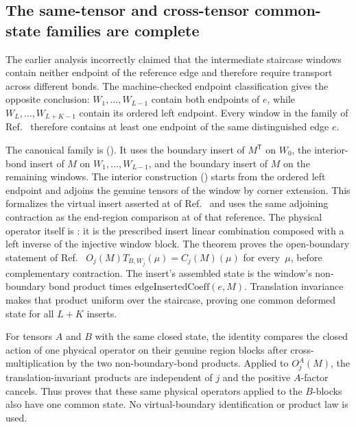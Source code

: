 \documentclass{article}
\begin{document}
\subsection{The same-tensor and cross-tensor common-state families are complete}

The earlier analysis incorrectly claimed that the intermediate staircase windows contain
neither endpoint of the reference edge and therefore require transport across different
bonds.  The machine-checked endpoint classification gives the opposite conclusion:
$W_1,\ldots,W_{L-1}$ contain both endpoints of $e$, while
$W_L,\ldots,W_{L+K-1}$ contain its ordered left endpoint. Every window in
the family of Ref.~\cite{Molnar2018NormalPEPS} therefore contains at least
one endpoint of the same distinguished edge $e$.

The canonical family is
().  It uses the boundary insert
of $M^{\mathsf T}$ on $W_0$, the interior-bond insert of $M$ on
$W_1,\ldots,W_{L-1}$, and the boundary insert of $M$ on the remaining windows.  The
interior construction
() starts from the ordered left
endpoint and adjoins the genuine tensors of the window by corner extension.  This formalizes the virtual insert asserted at
 of
Ref.~\cite{Molnar2018NormalPEPS} and uses the same adjoining contraction as
the end-region comparison at
 of that reference.  The physical operator itself is
: it is the prescribed insert
linear combination composed with a left inverse of the injective window block.  The theorem
 proves the open-boundary statement of
Ref.~\cite{Molnar2018NormalPEPS}
$O_j(M)T_{B,W_j}(\mu)=C_j(M)(\mu)$ for every~$\mu$, before complementary contraction.
The insert's assembled state is the window's non-boundary bond product times
$\mathrm{edgeInsertedCoeff}(e,M)$.  Translation
invariance makes that product uniform over the staircase, proving one common deformed
state for all $L+K$ inserts.

For tensors $A$ and $B$ with the same closed state, the identity
compares the closed action of one physical operator on their genuine region
blocks after cross-multiplication by the two non-boundary-bond products.  Applied
to $O_j^A(M)$, the translation-invariant products are independent of $j$ and
the positive $A$-factor cancels.  Thus
proves that these same physical operators applied to the $B$-blocks also have
one common state.  No virtual-boundary identification or product law is used.
\end{document}
